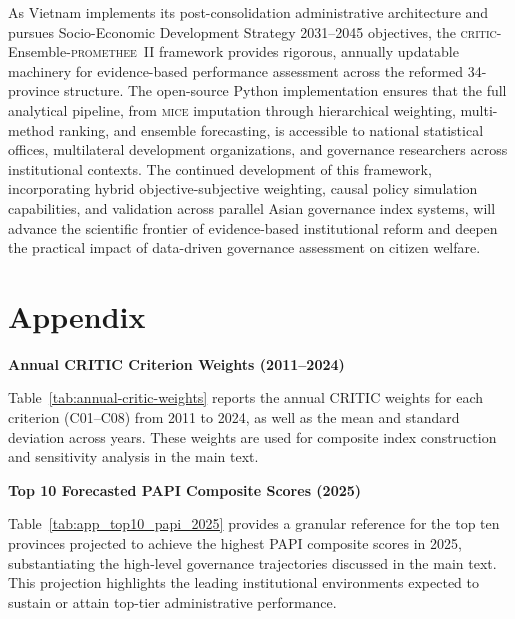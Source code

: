 \documentclass[12pt,a4paper]{article}
\newcommand{\MICE}{\textsc{mice}\xspace}
\newcommand{\CRITIC}{\textsc{critic}\xspace}
\newcommand{\PROMETHEE}{\textsc{promethee}\xspace}
\begin{document}
As Vietnam implements its post-consolidation administrative architecture and pursues Socio-Economic Development Strategy 2031--2045 objectives, the \CRITIC-Ensemble-\PROMETHEE~II framework provides rigorous, annually updatable machinery for evidence-based performance assessment across the reformed 34-province structure. The open-source Python implementation ensures that the full analytical pipeline, from \MICE imputation through hierarchical weighting, multi-method ranking, and ensemble forecasting, is accessible to national statistical offices, multilateral development organizations, and governance researchers across institutional contexts. The continued development of this framework, incorporating hybrid objective-subjective weighting, causal policy simulation capabilities, and validation across parallel Asian governance index systems, will advance the scientific frontier of evidence-based institutional reform and deepen the practical impact of data-driven governance assessment on citizen welfare.

\section{Appendix}

\textbf{Annual CRITIC Criterion Weights (2011--2024)}

Table~\ref{tab:annual-critic-weights} reports the annual CRITIC weights for each criterion (C01--C08) from 2011 to 2024, as well as the mean and standard deviation across years. These weights are used for composite index construction and sensitivity analysis in the main text.



\vspace{1em}
\textbf{Top 10 Forecasted PAPI Composite Scores (2025)}

Table~\ref{tab:app_top10_papi_2025} provides a granular reference for the top ten provinces projected to achieve the highest PAPI composite scores in 2025, substantiating the high-level governance trajectories discussed in the main text. This projection highlights the leading institutional environments expected to sustain or attain top-tier administrative performance.
\end{document}
